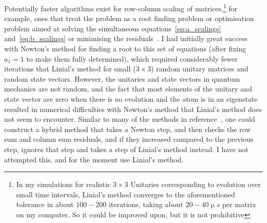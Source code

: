 Potentially faster algorithms exist for row-column scaling of matrices,\footnote{In my simulations for realistic $3\times3$ Unitaries corresponding to evolution over small time intervals, Linial's method converges to the aforementioned tolerance in about $100-200$ iterations, taking about $20-40\unit{\upmu s}$ per matrix on my computer. So it could be improved upon, but it is not prohibitive} for example, ones that treat the problem as a root finding problem or optimisation problem aimed at solving the simultaneous equations~\eqref{eq:a_scalings} and~\eqref{eq:b_scalings} or minimising the residuals~\cite{knight_fast_2013}. I had initially great success with Newton's method for finding a root to this set of equations (after fixing $a_1=1$ to make them fully determined), which required considerably fewer iterations that Linial's method for small ($3\times3$) random unitary matrices and random state vectors. However, the unitaries and state vectors in quantum mechanics are not random, and the fact that most elements of the unitary and state vector are zero when there is no evolution and the atom is in an eigenstate resulted in numerical difficulties with Newton's method that Linial's method does not seem to encounter. Similar to many of the methods in reference~\cite{knight_fast_2013}, one could construct a hybrid method that takes a Newton step, and then checks the row sum and column sum residuals, and if they increased compared to the previous step, ignores that step and takes a step of Linial's method instead. I have not attempted this, and for the moment use Linial's method.

